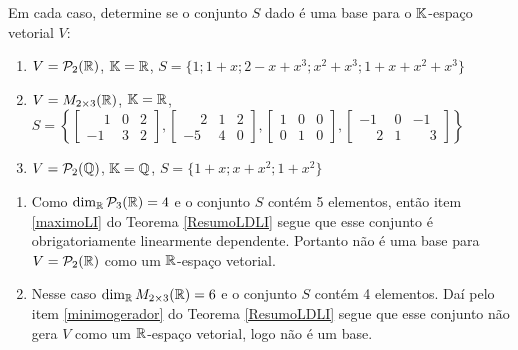 \begin{exemplos}
  Em cada caso, determine se o conjunto $S$ dado é uma base para o $\mathbb{K}$-espaço vetorial $V$:
  \begin{enumerate}
    \item $V = \mathcal{P}_2(\mathbb{R})$, $\mathbb{K} = \mathbb{R}$, $S = \{1; 1 + x; 2 - x + x^3; x^2 + x^3; 1 + x + x^2 + x^3\}$

    \item $V = M_{2 \times 3}(\mathbb{R})$, $\mathbb{K} = \mathbb{R}$, $S = \left\{\begin{bmatrix}\phantom{-} 1 & 0 & 2\\-1 & 3 & 2\end{bmatrix}, \begin{bmatrix}\phantom{-} 2 & 1 & 2\\-5 & 4 & 0\end{bmatrix}, \begin{bmatrix}1 & 0 & 0\\0 & 1 & 0\end{bmatrix},\begin{bmatrix}-1 & 0 & -1\\\phantom{-} 2 & 1 & \phantom{-} 3\end{bmatrix}\right\}$

    \item $V = \mathcal{P}_2(\mathbb{Q})$, $\mathbb{K} = \mathbb{Q}$, $S = \{1 + x; x + x^2; 1 + x^2\}$
  \end{enumerate}

  \begin{solucao}
    \begin{enumerate}
      \item Como $\dim_{\mathbb{R}}\mathcal{P}_3(\mathbb{R}) = 4$ e o conjunto $S$ contém 5 elementos, então item \ref{maximoLI} do Teorema \ref{ResumoLDLI} segue que esse conjunto é obrigatoriamente linearmente dependente. Portanto não é uma base para $V = \mathcal{P}_2(\mathbb{R})$ como um $\mathbb{R}$-espaço vetorial.

      \item Nesse caso $\dim_{\mathbb{R}} M_{2 \times 3}(\mathbb{R}) = 6$ e o conjunto $S$ contém 4 elementos. Daí pelo item \ref{minimogerador} do Teorema \ref{ResumoLDLI} segue que esse conjunto não gera $V$ como um $\mathbb{R}$-espaço vetorial, logo não é um base.


\end{enumerate}
\end{solucao}
\end{exemplos}

